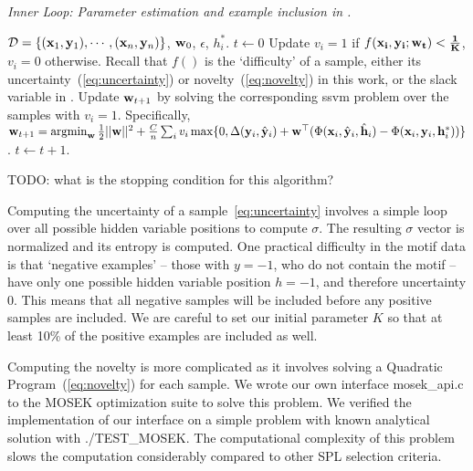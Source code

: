 \documentclass{article}
\newcommand{\mytopcaption}[1]{\caption{\em \footnotesize #1}}
\newcommand{\argmin}{\operatornamewithlimits{argmin}}
\begin{document}
\begin{algorithm}[h!]
\mytopcaption{Inner Loop: Parameter estimation and example inclusion in \sc{SPL}.}
\label{algo:latentSSVM}
\begin{algorithmic}[1]
\INPUT ${\cal D} = \{({\bf x}_1,{\bf y}_1),\cdots,({\bf x}_n,{\bf y}_n)\}$, ${\bf w}_0$, $\epsilon$, $h_i^*$.
\STATE $t \leftarrow 0$
\REPEAT
\STATE Update $v_i = 1$ if $f(\bf x_i, \bf y_i;\bf w_t) < \frac{1}{K}$, $v_i=0$ otherwise.  Recall that $f()$ is the `difficulty' of a sample, either its uncertainty~(\ref{eq:uncertainty}) or novelty~(\ref{eq:novelty}) in this work, or the slack variable in \cite{SPL}.
\STATE Update ${\bf w}_{t+1}$ by solving the corresponding
{\sc ssvm} problem over the samples with $v_i=1$. Specifically, \\
${\bf w}_{t+1} = \argmin_{\bf w} \frac{1}{2}||{\bf w}||^2 + \frac{C}{n}\sum_{i} v_i\max\{0,\Delta({\bf y}_i,\hat{\bf y}_i) +
		{\bf w}^\top (\Phi({\bf x}_i,\hat{\bf y}_i,\hat{\bf h}_i) - \Phi({\bf x}_i,{\bf y}_i,{\bf h}_i^*))\}$.
\STATE $t \leftarrow t + 1$.
\end{algorithmic}
\end{algorithm}

TODO: what is the stopping condition for this algorithm?

Computing the uncertainty of a sample~\ref{eq:uncertainty} involves a simple loop over all possible hidden variable positions to compute $\sigma$.  The resulting $\sigma$ vector is normalized and its entropy is computed.  One practical difficulty in the motif data is that `negative examples' -- those with $y=-1$, who do not contain the motif -- have only one possible hidden variable position $h=-1$, and therefore uncertainty 0.  This means that all negative samples will be included before any positive samples are included.  We are careful to set our initial parameter $K$ so that at least 10\% of the positive examples are included as well.

Computing the novelty is more complicated as it involves solving a Quadratic Program~(\ref{eq:novelty}) for each sample.  We wrote our own interface {\sc mosek\_api.c} to the MOSEK optimization suite \cite{Mosek} to solve this problem.  We verified the implementation of our interface on a simple problem with known analytical solution with {\sc ./TEST\_MOSEK}.  The computational complexity of this problem slows the computation considerably compared to other SPL selection criteria.
\end{document}
